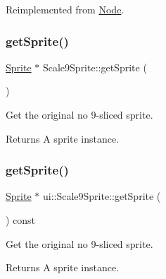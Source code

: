 Reimplemented from \hyperlink{classNode_ab87661ab8940512baf2e7639ea55ff87}{Node}.

\mbox{\label{classui_1_1Scale9Sprite_a22fb324eb7d6b34a3235d0e2dc91ac40}} 
\subsubsection{\texorpdfstring{get\+Sprite()}{getSprite()}\hspace{0.1cm}{\footnotesize\ttfamily [1/2]}}
{\footnotesize\ttfamily \hyperlink{classSprite}{Sprite} $\ast$ Scale9\+Sprite\+::get\+Sprite (\begin{DoxyParamCaption}{ }\end{DoxyParamCaption})}



Get the original no 9-\/sliced sprite. 

\begin{DoxyReturn}{Returns}
A sprite instance. 
\end{DoxyReturn}
\mbox{\label{classui_1_1Scale9Sprite_aabbca98d76b47125df8f3aab740b91b4}} 
\subsubsection{\texorpdfstring{get\+Sprite()}{getSprite()}\hspace{0.1cm}{\footnotesize\ttfamily [2/2]}}
{\footnotesize\ttfamily \hyperlink{classSprite}{Sprite} $\ast$ ui\+::\+Scale9\+Sprite\+::get\+Sprite (\begin{DoxyParamCaption}{ }\end{DoxyParamCaption}) const}



Get the original no 9-\/sliced sprite. 

\begin{DoxyReturn}{Returns}
A sprite instance. 
\end{DoxyReturn}
\mbox{\label{classui_1_1Scale9Sprite_a9691739d94e41e98acceb0465d2e24bd}} 
